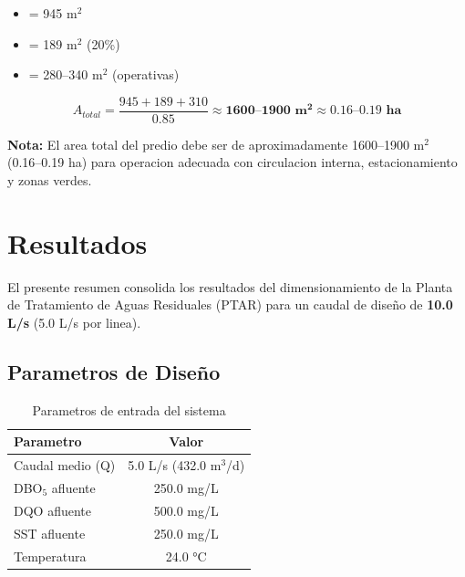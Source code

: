 \documentclass[12pt,a4paper]{article}
\begin{document}
\begin{itemize}[noitemsep,leftmargin=2em]
    \item[$A_{tratamiento}$] = 945 m$^2$
    \item[$A_{amortiguacion}$] = 189 m$^2$ (20\%)
    \item[$A_{complementarias}$] = 280--340 m$^2$ (operativas)
\end{itemize}

\begin{equation}
A_{total} = \frac{945 + 189 + 310}{0.85} \approx \mathbf{1600 \text{--} 1900 \text{ m}^2} \approx \mathbf{0.16 \text{--} 0.19 \text{ ha}}
\end{equation}

\textbf{Nota:} El area total del predio debe ser de aproximadamente 1600--1900 m$^2$ (0.16--0.19 ha) para operacion adecuada con circulacion interna, estacionamiento y zonas verdes.



\newpage
\section{Resultados}

El presente resumen consolida los resultados del dimensionamiento de la Planta de Tratamiento de Aguas Residuales (PTAR) para un caudal de dise\~no de \textbf{10.0 L/s} (5.0 L/s por linea).

\subsection{Parametros de Dise\~no}

\begin{table}[H]
\centering
\caption{Parametros de entrada del sistema}
\begin{tabular}{lc}
\toprule
\textbf{Parametro} & \textbf{Valor} \\
\midrule
Caudal medio (Q) & 5.0 L/s (432.0 m$^3$/d) \\
DBO$_5$ afluente & 250.0 mg/L \\
DQO afluente & 500.0 mg/L \\
SST afluente & 250.0 mg/L \\
Temperatura & 24.0 °C \\
\bottomrule
\end{tabular}
\end{table}
\end{document}
